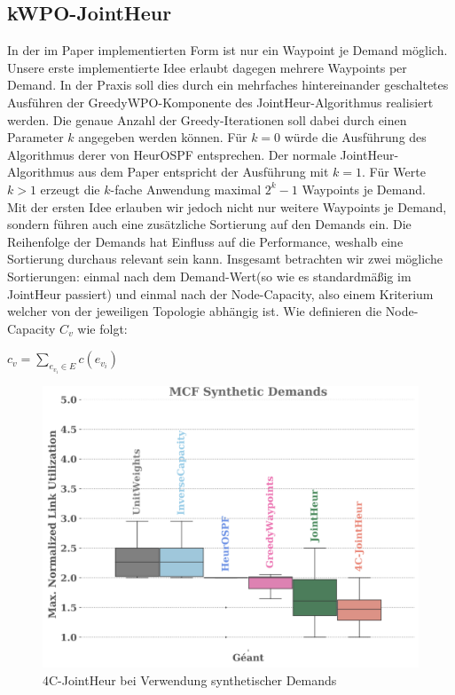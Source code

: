 \documentclass[sigconf]{acmart}
\begin{document}
\subsection{kWPO-JointHeur}
In der im Paper implementierten Form ist nur ein Waypoint je Demand möglich. Unsere erste implementierte Idee erlaubt dagegen mehrere Waypoints per Demand.
In der Praxis soll dies durch ein mehrfaches hintereinander geschaltetes Ausführen der GreedyWPO-Komponente des JointHeur-Algorithmus realisiert werden. Die genaue Anzahl der Greedy-Iterationen
soll dabei durch einen Parameter $k$ angegeben werden können. Für $k = 0$ würde die Ausführung des Algorithmus derer von HeurOSPF entsprechen. Der normale JointHeur-Algorithmus aus dem Paper entspricht der Ausführung mit $k=1$. Für Werte $k > 1$ erzeugt die $k$-fache Anwendung maximal $2^{k}-1$ Waypoints je Demand. \\
Mit der ersten Idee erlauben wir jedoch nicht nur weitere Waypoints je Demand, sondern führen auch eine zusätzliche Sortierung auf den Demands ein. Die Reihenfolge der Demands hat Einfluss auf die Performance, weshalb eine Sortierung durchaus relevant sein kann. Insgesamt betrachten wir zwei mögliche Sortierungen: einmal nach dem Demand-Wert(so wie es standardmäßig im JointHeur passiert) und einmal nach der Node-Capacity, also einem Kriterium welcher von der jeweiligen Topologie abhängig ist.
Wie definieren die Node-Capacity $C_v$ wie folgt: \begin{center} $c_v = \sum_{e_{v_{i}} \in E} c(e_{v_i})$\end{center}
\begin{figure}[h]
  \centering 
  \includegraphics[width=\linewidth]{abbildungen/PNG-Bild}
  \caption{4C-JointHeur bei Verwendung synthetischer Demands}
\end{figure}
\end{document}
